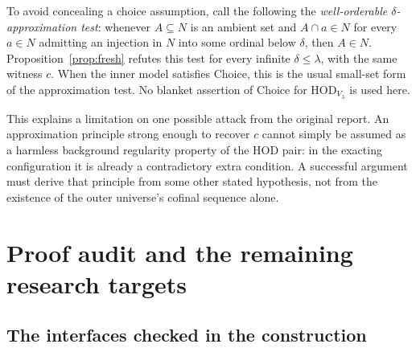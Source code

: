 \documentclass[11pt,letterpaper]{article}
\theoremstyle{definition}
\newcommand{\HOD}{\mathrm{HOD}}
\begin{document}
To avoid concealing a choice assumption, call the following the
\emph{well-orderable $\delta$-approximation test}: whenever $A\subseteq N$
is an ambient set and $A\cap a\in N$ for every $a\in N$ admitting
an injection in $N$ into some ordinal below $\delta$, then $A\in N$.
Proposition~\ref{prop:fresh} refutes this test for every infinite
$\delta\leq\lambda$, with the same witness $c$.
When the inner model satisfies Choice, this is the usual small-set
form of the approximation test. No blanket assertion of Choice for
$\HOD_{V_\lambda}$ is used here.

This explains a limitation on one possible attack from the original
report. An approximation principle strong enough to recover $c$ cannot
simply be assumed as a harmless background regularity property of the
HOD pair: in the exacting configuration it is already a contradictory
extra condition. A successful argument must derive that principle from
some other stated hypothesis, not from the existence of the outer
universe's cofinal sequence alone.

\section{Proof audit and the remaining research targets}\label{sec:audit}

\subsection{The interfaces checked in the construction}
\end{document}
